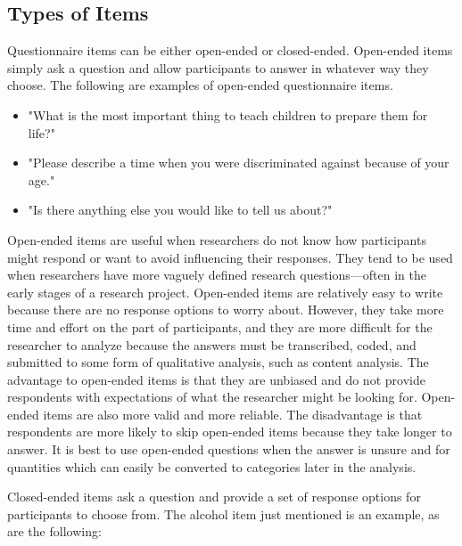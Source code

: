\subsection{Types of Items}


Questionnaire items can be either open-ended or closed-ended. Open-ended items simply ask a question and allow participants to answer in whatever way they choose. The following are examples of open-ended questionnaire items.

\begin{itemize}
\item  "What is the most important thing to teach children to prepare them for life?"

\item "Please describe a time when you were discriminated against because of your age."

\item  "Is there anything else you would like to tell us about?"
\end{itemize}


Open-ended items are useful when researchers do not know how participants might respond or want to avoid influencing their responses. They tend to be used when researchers have more vaguely defined research questions---often in the early stages of a research project. Open-ended items are relatively easy to write because there are no response options to worry about. However, they take more time and effort on the part of participants, and they are more difficult for the researcher to analyze because the answers must be transcribed, coded, and submitted to some form of qualitative analysis, such as content analysis. The advantage to open-ended items is that they are unbiased and do not provide respondents with expectations of what the researcher might be looking for. Open-ended items are also more valid and more reliable. The disadvantage is that respondents are more likely to skip open-ended items because they take longer to answer. It is best to use open-ended questions when the answer is unsure and for quantities which can easily be converted to categories later in the analysis.


Closed-ended items ask a question and provide a set of response options for participants to choose from. The alcohol item just mentioned is an example, as are the following:


